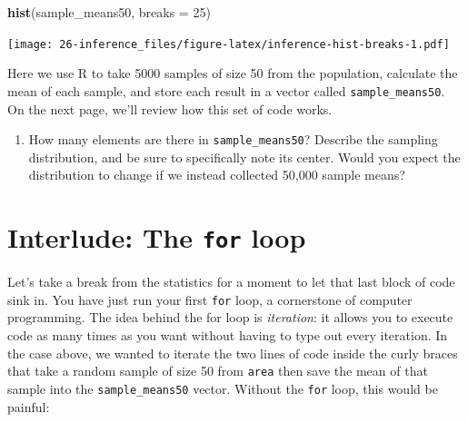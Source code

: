 \documentclass[]{book}
\newenvironment{Shaded}{\begin{snugshade}}{\end{snugshade}}
\newcommand{\KeywordTok}[1]{\textcolor[rgb]{0.13,0.29,0.53}{\textbf{{#1}}}}
\newcommand{\DataTypeTok}[1]{\textcolor[rgb]{0.13,0.29,0.53}{{#1}}}
\newcommand{\DecValTok}[1]{\textcolor[rgb]{0.00,0.00,0.81}{{#1}}}
\newcommand{\NormalTok}[1]{{#1}}
\providecommand{\tightlist}{%
  \setlength{\itemsep}{0pt}\setlength{\parskip}{0pt}}
\theoremstyle{definition}
\theoremstyle{definition}
\theoremstyle{remark}
\begin{document}
\begin{Shaded}
\begin{Highlighting}[]
\KeywordTok{hist}\NormalTok{(sample_means50, }\DataTypeTok{breaks =} \DecValTok{25}\NormalTok{)}
\end{Highlighting}
\end{Shaded}

\texttt{[image: 26-inference\_files/figure-latex/inference-hist-breaks-1.pdf]}

Here we use R to take 5000 samples of size 50 from the population,
calculate the mean of each sample, and store each result in a vector
called \texttt{sample\_means50}. On the next page, we'll review how this
set of code works.

\begin{enumerate}
\def\labelenumi{\arabic{enumi}.}
\setcounter{enumi}{3}
\tightlist
\item
  How many elements are there in \texttt{sample\_means50}? Describe the
  sampling distribution, and be sure to specifically note its center.
  Would you expect the distribution to change if we instead collected
  50,000 sample means?
\end{enumerate}

\section*{\texorpdfstring{Interlude: The \texttt{for}
loop}{Interlude: The for loop}}\label{interlude-the-for-loop}

Let's take a break from the statistics for a moment to let that last
block of code sink in. You have just run your first \texttt{for} loop, a
cornerstone of computer programming. The idea behind the for loop is
\emph{iteration}: it allows you to execute code as many times as you
want without having to type out every iteration. In the case above, we
wanted to iterate the two lines of code inside the curly braces that
take a random sample of size 50 from \texttt{area} then save the mean of
that sample into the \texttt{sample\_means50} vector. Without the
\texttt{for} loop, this would be painful:
\end{document}
